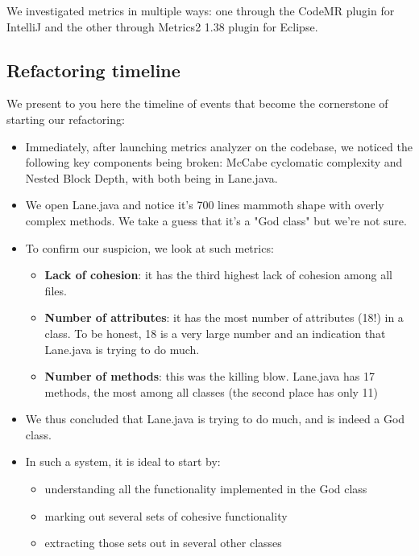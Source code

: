 We investigated metrics in multiple ways: one through the CodeMR plugin for IntelliJ and the other through Metrics2 1.38 plugin for Eclipse.

\subsection{Refactoring timeline}

We present to you here the timeline of events that become the cornerstone of starting our refactoring:

\begin{itemize}

    \item Immediately, after launching metrics analyzer on the codebase, we noticed the following key components being broken: McCabe cyclomatic complexity and Nested Block Depth, with both being in Lane.java.
    \item We open Lane.java and notice it's 700 lines mammoth shape with overly complex methods. We take a guess that it's a "God class" but we're not sure.
    \item To confirm our suspicion, we look at such metrics:

          \begin{itemize}
              \item \textbf{Lack of cohesion}: it has the third highest lack of cohesion among all files.
              \item \textbf{Number of attributes}: it has the most number of attributes (18!) in a class. To be honest, 18 is a very large number and an indication that Lane.java is trying to do much.
              \item \textbf{Number of methods}: this was the killing blow. Lane.java has 17 methods, the most among all classes (the second place has only 11)
          \end{itemize}

    \item We thus concluded that Lane.java is trying to do much, and is indeed a God class.
    \item In such a system, it is ideal to start by:
          \begin{itemize}
              \item understanding all the functionality implemented in the God class
              \item marking out several sets of cohesive functionality
              \item extracting those sets out in several other classes
          \end{itemize}


\end{itemize}
